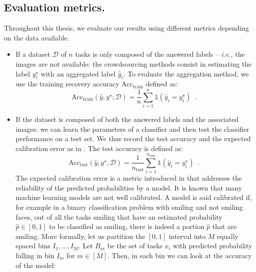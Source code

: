 \subsection{Evaluation metrics.}
\label{sub:evaluation-metrics}
Throughout this thesis, we evaluate our results using different metrics depending on the data available.
\begin{itemize}
    \item If a dataset $\mathcal{D}$ of $n$ tasks is only composed of the answered labels -- \emph{i.e.,} the images are not available: the crowdsourcing methods consist in estimating the label $y^\star_i$ with an aggregated label $\hat y_i$. To evaluate the aggregation method, we use the training recovery accuracy $\mathrm{Acc}_{\text{train}}$ defined as:
    \begin{equation}\label{eq:acctrain}
        \mathrm{Acc}_{\text{train}}(\hat y, y^\star; \mathcal{D}) = \frac{1}{n} \sum_{i=1}^{n} \mathds{1}(\hat y_i = y^\star_i)\enspace.
    \end{equation}
    \item If the dataset is composed of both the answered labels and the associated images: we can learn the parameters of a classifier and then test the classifier performance on a test set. We thus record the test accuracy and the expected calibration error as in \citet{guo_calibration_2017}. The test accuracy is defined as:
        \begin{equation}\label{eq:acctest}
        \mathrm{Acc}_{\text{test}}(\hat y, y^\star,\mathcal{D}) = \frac{1}{n_{\text{test}}}\sum_{i=1}^{n_\text{test}} \mathds{1}(\hat y_i = y^\star_i)\enspace.
    \end{equation}
    The expected calibration error is a metric introduced in \citet{naeini2015obtaining} that addresses the reliability of the predicted probabilities by a model.
    It is known that many machine learning models \citep{guo_calibration_2017} are not well calibrated.
    A model is said calibrated if, for example in a binary classification problem with smiling and not smiling faces, out of all the tasks smiling that have an estimated probability $\hat p\in [0,1]$ to be classified as smiling, there is indeed a portion $\hat p$ that are smiling.
    More formally, let us partition the $[0,1]$ interval into $M$ equally spaced bins $I_1,\dots,I_M$.
    Let $B_m$ be the set of tasks $x_i$ with predicted probability falling in bin $I_m$ for $m\in [M]$.
    Then, in each bin we can look at the accuracy of the model:
    \begin{equation}\label{eq:accuracyBm}

\end{equation}
\end{itemize}
